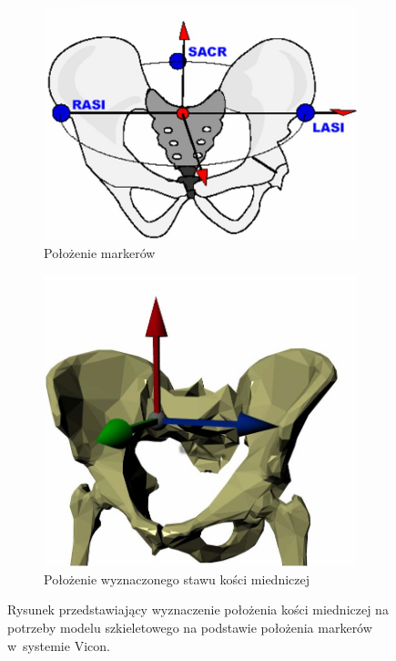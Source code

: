 \begin{figure}
	\centering	
	\begin{subfigure}[b]{0.48\textwidth}
		\centering
		\includegraphics[width=\linewidth]{images/pelvisEstimationA.jpg}
		\caption{Położenie markerów}
		\label{fig:literature:vicon:pelvisPlacementA}
	\end{subfigure}	
	\begin{subfigure}[b]{0.48\textwidth}
		\centering
		\includegraphics[width=\linewidth]{images/pelvisEstimationB.jpg}
		\caption{Położenie wyznaczonego stawu kości miedniczej}
		\label{fig:literature:vicon:pelvisPlacementB}
	\end{subfigure}	
	\caption{Rysunek przedstawiający wyznaczenie położenia kości miedniczej na potrzeby modelu szkieletowego na podstawie położenia markerów w~systemie Vicon\cite{ViconModelingInstruction}.}
	\label{fig:literature:vicon:pelvisPlacement}
\end{figure}
		
